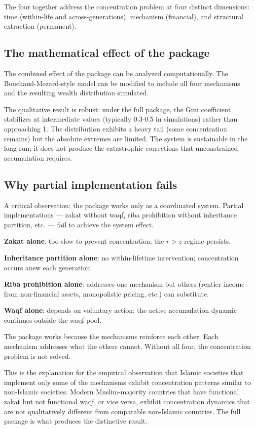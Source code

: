 The four together address the concentration problem at four
distinct dimensions: time (within-life and across-generations),
mechanism (financial), and structural extraction (permanent).

\subsection{The mathematical effect of the package}

The combined effect of the package can be analyzed
computationally. The Bouchaud-Mezard-style model can be modified
to include all four mechanisms and the resulting wealth
distribution simulated.

The qualitative result is robust: under the full package, the
Gini coefficient stabilizes at intermediate values (typically
0.3-0.5 in simulations) rather than approaching 1. The
distribution exhibits a heavy tail (some concentration remains)
but the absolute extremes are limited. The system is sustainable
in the long run; it does not produce the catastrophic corrections
that unconstrained accumulation requires.

\subsection{Why partial implementation fails}

A critical observation: the package works only as a coordinated
system. Partial implementations --- zakat without waqf, riba
prohibition without inheritance partition, etc. --- fail to
achieve the system effect.

\textbf{Zakat alone}: too slow to prevent concentration; the
$r > z$ regime persists.

\textbf{Inheritance partition alone}: no within-lifetime
intervention; concentration occurs anew each generation.

\textbf{Riba prohibition alone}: addresses one mechanism but
others (rentier income from non-financial assets, monopolistic
pricing, etc.) can substitute.

\textbf{Waqf alone}: depends on voluntary action; the active
accumulation dynamic continues outside the waqf pool.

The package works because the mechanisms reinforce each other. Each
mechanism addresses what the others cannot. Without all four, the
concentration problem is not solved.

This is the explanation for the empirical observation that Islamic
societies that implement only some of the mechanisms exhibit
concentration patterns similar to non-Islamic societies. Modern
Muslim-majority countries that have functional zakat but not
functional waqf, or vice versa, exhibit concentration dynamics
that are not qualitatively different from comparable non-Islamic
countries. The full package is what produces the distinctive
result.

